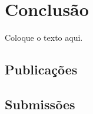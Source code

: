\chapter*[Conclusão]{Conclusão}

Coloque o texto aqui.


\section*{Publicações}


\section*{Submissões}


